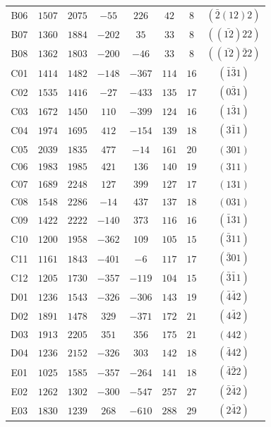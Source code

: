 \begin{table}[H]
\begin{tabular}{c|c|c|c|c|c|c|c}
        B06 & $1507$ & $2075$ & $ -55$ & $ 226$ & $ 42$ & $ 8$ & $(\bar{2}(12)2)$ \\
        B07 & $1360$ & $1884$ & $-202$ & $  35$ & $ 33$ & $ 8$ & $((\bar{12})22)$ \\
        B08 & $1362$ & $1803$ & $-200$ & $ -46$ & $ 33$ & $ 8$ & $((\bar{12})\bar{2}2)$ \\
        C01 & $1414$ & $1482$ & $-148$ & $-367$ & $114$ & $16$ & $(\bar{1}\bar{3}1)$ \\
        C02 & $1535$ & $1416$ & $ -27$ & $-433$ & $135$ & $17$ & $(0\bar{3}1)$ \\
        C03 & $1672$ & $1450$ & $ 110$ & $-399$ & $124$ & $16$ & $(1\bar{3}1)$ \\
        C04 & $1974$ & $1695$ & $ 412$ & $-154$ & $139$ & $18$ & $(3\bar{1}1)$ \\
        C05 & $2039$ & $1835$ & $ 477$ & $ -14$ & $161$ & $20$ & $(301)$ \\
        C06 & $1983$ & $1985$ & $ 421$ & $ 136$ & $140$ & $19$ & $(311)$ \\
        C07 & $1689$ & $2248$ & $ 127$ & $ 399$ & $127$ & $17$ & $(131)$ \\
        C08 & $1548$ & $2286$ & $ -14$ & $ 437$ & $137$ & $18$ & $(031)$ \\
        C09 & $1422$ & $2222$ & $-140$ & $ 373$ & $116$ & $16$ & $(\bar{1}31)$ \\
        C10 & $1200$ & $1958$ & $-362$ & $ 109$ & $105$ & $15$ & $(\bar{3}11)$ \\
        C11 & $1161$ & $1843$ & $-401$ & $  -6$ & $117$ & $17$ & $(\bar{3}01)$ \\
        C12 & $1205$ & $1730$ & $-357$ & $-119$ & $104$ & $15$ & $(\bar{3}\bar{1}1)$ \\
        D01 & $1236$ & $1543$ & $-326$ & $-306$ & $143$ & $19$ & $(\bar{4}\bar{4}2)$ \\
        D02 & $1891$ & $1478$ & $ 329$ & $-371$ & $172$ & $21$ & $(4\bar{4}2)$ \\
        D03 & $1913$ & $2205$ & $ 351$ & $ 356$ & $175$ & $21$ & $(442)$ \\
        D04 & $1236$ & $2152$ & $-326$ & $ 303$ & $142$ & $18$ & $(\bar{4}42)$ \\
        E01 & $1025$ & $1585$ & $-357$ & $-264$ & $141$ & $18$ & $(\bar{4}\bar{2}2)$ \\
        E02 & $1262$ & $1302$ & $-300$ & $-547$ & $257$ & $27$ & $(\bar{2}\bar{4}2)$ \\
        E03 & $1830$ & $1239$ & $ 268$ & $-610$ & $288$ & $29$ & $(2\bar{4}2)$ \\

\end{tabular}
\end{table}

